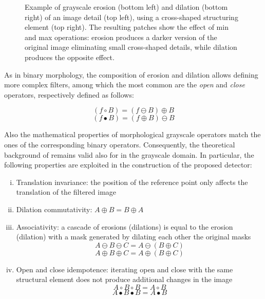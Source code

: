 \documentclass{ieeeaccess}
\begin{document}
\begin{figure}[t!]
\begin{tabular}{cc}
	\end{tabular}
	\caption{Example of grayscale erosion (bottom left) and dilation (bottom right) of an image detail (top left), using a cross-shaped structuring element (top right). The resulting patches show the effect of min and max operations: erosion produces a darker version of the original image eliminating small cross-shaped details, while dilation produces the opposite effect.}
	\label{fig:grayscale_ex}
\end{figure}

As in binary morphology, the composition of erosion and dilation allows defining more complex filters, among which the most common are the \textit{open} and \textit{close} operators, respectively defined as follows:

\begin{equation}
(f \circ B) = (f \ominus B) \oplus B
\end{equation}
\vspace{-0.5cm}
\begin{equation}
(f \bullet B) = (f \oplus B) \ominus B
\end{equation}

Also the mathematical properties of morphological grayscale operators match the ones of the corresponding binary operators. Consequently, the theoretical background of \cite{de2017detecting} remains valid also for in the grayscale domain. In particular, the following properties are exploited in the construction of the proposed detector:

\begin{enumerate}[(i)]
	\item Translation invariance: the position of the reference point only affects the translation of the filtered image
	\item Dilation commutativity: $A\oplus B = B \oplus A$
	\item Associativity: a cascade of erosions (dilations) is equal to the erosion (dilation) with a mask generated by dilating each other the original masks
	\begin{equation}
	A \ominus B \ominus C = A \ominus (B \oplus C)
	\end{equation}
	\vspace{-0.5cm}
	\begin{equation}
	A \oplus B \oplus C = A \oplus (B \oplus C)
	\end{equation} 
	\item Open and close idempotence: iterating open and close with the same structural element does not produce additional changes in the image
	\begin{equation}
	A \circ B \circ B = A \circ B
	\end{equation}
	\vspace{-0.5cm}
	\begin{equation}
	A \bullet B \bullet B = A \bullet B
	\end{equation} 
\end{enumerate}
\end{document}
